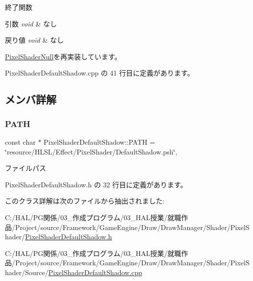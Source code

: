 終了関数 


\begin{DoxyParams}{引数}
{\em void} & なし \\
\hline
\end{DoxyParams}

\begin{DoxyRetVals}{戻り値}
{\em void} & なし \\
\hline
\end{DoxyRetVals}


\mbox{\hyperlink{class_pixel_shader_null_adca4c44cd25c90a5ebd75b459f5e641e}{Pixel\+Shader\+Null}}を再実装しています。



 Pixel\+Shader\+Default\+Shadow.\+cpp の 41 行目に定義があります。



\subsection{メンバ詳解}
\mbox{\label{class_pixel_shader_default_shadow_a689c29d30938bcd03246929bc99b3907}} 
\subsubsection{\texorpdfstring{P\+A\+TH}{PATH}}
{\footnotesize\ttfamily const char $\ast$ Pixel\+Shader\+Default\+Shadow\+::\+P\+A\+TH = \char`\"{}resource/H\+L\+SL/Effect/Pixel\+Shader/Default\+Shadow.\+psh\char`\"{}\hspace{0.3cm}{\ttfamily [static]}, {\ttfamily [private]}}



ファイルパス 



 Pixel\+Shader\+Default\+Shadow.\+h の 32 行目に定義があります。



このクラス詳解は次のファイルから抽出されました\+:\begin{DoxyCompactItemize}
\item 
C\+:/\+H\+A\+L/\+P\+G関係/03\+\_\+作成プログラム/03\+\_\+\+H\+A\+L授業/就職作品/\+Project/source/\+Framework/\+Game\+Engine/\+Draw/\+Draw\+Manager/\+Shader/\+Pixel\+Shader/\mbox{\hyperlink{_pixel_shader_default_shadow_8h}{Pixel\+Shader\+Default\+Shadow.\+h}}\item 
C\+:/\+H\+A\+L/\+P\+G関係/03\+\_\+作成プログラム/03\+\_\+\+H\+A\+L授業/就職作品/\+Project/source/\+Framework/\+Game\+Engine/\+Draw/\+Draw\+Manager/\+Shader/\+Pixel\+Shader/\+Source/\mbox{\hyperlink{_pixel_shader_default_shadow_8cpp}{Pixel\+Shader\+Default\+Shadow.\+cpp}}\end{DoxyCompactItemize}
